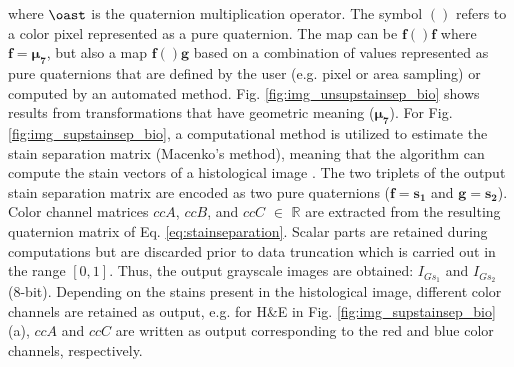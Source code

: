 \documentclass[superscriptaddress,longbibliography,aps,prl,twocolumn,10pt]{revtex4-2}
\begin{document}
\noindent
where $\oast$ is the quaternion multiplication operator. The symbol $()$ refers to a color pixel represented as a pure quaternion. The map can be $\boldsymbol{f}()\boldsymbol{f}$ where $\boldsymbol{f} = \boldsymbol{\mu_{7}}$, but also a map $\boldsymbol{f}()\boldsymbol{g}$ based on a combination of values represented as pure quaternions that are defined by the user (e.g. pixel or area sampling) or computed by an automated method. Fig. \ref{fig:img_unsupstainsep_bio} shows results from transformations that have geometric meaning ($\boldsymbol{\mu_{7}}$). For Fig. \ref{fig:img_supstainsep_bio}, a computational method is utilized to estimate the stain separation matrix (Macenko's method), meaning that the algorithm can compute the stain vectors of a histological image \cite{Macenko2009, stain_normalisation_toolbox_v2_2}. The two triplets of the output stain separation matrix are encoded as two pure quaternions ($\boldsymbol{f}=\boldsymbol{s_{1}}$ and $\boldsymbol{g}=\boldsymbol{s_{2}}$). Color channel matrices $ccA$, $ccB$, and $ccC$ $\in$ $\mathbb{R}$ are extracted from the resulting quaternion matrix of Eq. \ref{eq:stainseparation}. Scalar parts are retained during computations but are discarded prior to data truncation which is carried out in the range $[0,1]$. Thus, the output grayscale images are obtained: $I_{Gs_{1}}$ and $I_{Gs_{2}}$ (8-bit). Depending on the stains present in the histological image, different color channels are retained as output, e.g. for H\&E in Fig. \ref{fig:img_supstainsep_bio}(a), $ccA$ and $ccC$ are written as output corresponding to the red and blue color channels, respectively.
\end{document}
